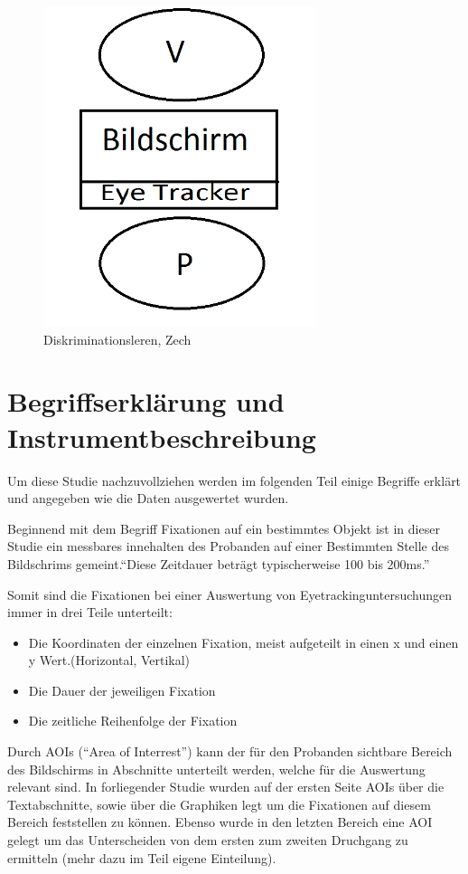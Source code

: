 \begin{figure}[!ht]
\noindent\hspace{0.5mm}\includegraphics[width=8cm]{./Ressourcen/Versuchsaufbau.png}
\caption{Diskriminationsleren, Zech}
\end{figure}

\section{Begriffserklärung und Instrumentbeschreibung}
Um diese Studie nachzuvollziehen werden im folgenden Teil einige Begriffe erklärt und angegeben wie die Daten ausgewertet wurden. 

Beginnend mit dem Begriff Fixationen auf ein bestimmtes Objekt ist in dieser Studie ein messbares innehalten des Probanden auf einer Bestimmten Stelle des Bildschrims gemeint.``Diese Zeitdauer beträgt typischerweise 100 bis 200ms.'' %

Somit sind die Fixationen bei einer Auswertung von Eyetrackinguntersuchungen immer in drei Teile unterteilt:
    \begin{itemize}
        \item Die Koordinaten der einzelnen Fixation, meist aufgeteilt in einen x und einen y Wert.(Horizontal, Vertikal)
        \item Die Dauer der jeweiligen Fixation
        \item Die zeitliche Reihenfolge der Fixation
    \end{itemize}

Durch AOIs (``Area of Interrest'') kann der für den Probanden sichtbare Bereich des Bildschirms in Abschnitte unterteilt werden, welche für die Auswertung relevant sind. In forliegender Studie wurden auf der ersten Seite AOIs über die Textabschnitte, sowie über die Graphiken legt um die Fixationen auf diesem Bereich feststellen zu können. Ebenso wurde in den letzten Bereich eine AOI gelegt um das Unterscheiden von dem ersten zum zweiten Druchgang zu ermitteln (mehr dazu im Teil eigene Einteilung).

